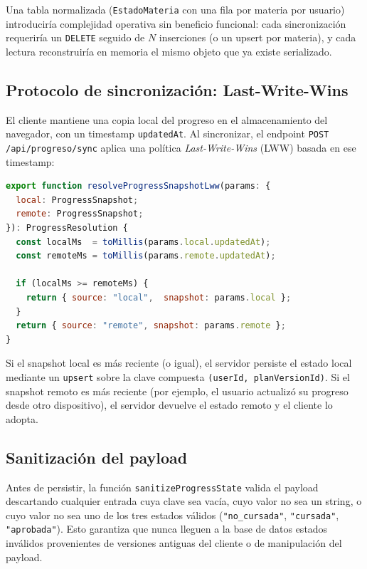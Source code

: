 \documentclass[12pt, a4paper]{report}
\begin{document}
Una tabla normalizada (\texttt{EstadoMateria} con una fila por materia por usuario)
introduciría complejidad operativa sin beneficio funcional: cada sincronización
requeriría un \texttt{DELETE} seguido de $N$ inserciones (o un upsert por materia),
y cada lectura reconstruiría en memoria el mismo objeto que ya existe serializado.

\subsection{Protocolo de sincronización: Last-Write-Wins}

El cliente mantiene una copia local del progreso en el almacenamiento del
navegador, con un timestamp \texttt{updatedAt}. Al sincronizar, el endpoint
\texttt{POST /api/progreso/sync} aplica una política
\textit{Last-Write-Wins} (LWW) basada en ese timestamp:

\begin{lstlisting}[language=JavaScript,
                   caption={Resolución LWW en \texttt{progressSync.ts}.}]
export function resolveProgressSnapshotLww(params: {
  local: ProgressSnapshot;
  remote: ProgressSnapshot;
}): ProgressResolution {
  const localMs  = toMillis(params.local.updatedAt);
  const remoteMs = toMillis(params.remote.updatedAt);

  if (localMs >= remoteMs) {
    return { source: "local",  snapshot: params.local };
  }
  return { source: "remote", snapshot: params.remote };
}
\end{lstlisting}

Si el snapshot local es más reciente (o igual), el servidor persiste el estado
local mediante un \texttt{upsert} sobre la clave compuesta
\texttt{(userId, planVersionId)}. Si el snapshot remoto es más reciente
(por ejemplo, el usuario actualizó su progreso desde otro dispositivo), el
servidor devuelve el estado remoto y el cliente lo adopta.

\subsection{Sanitización del payload}

Antes de persistir, la función \texttt{sanitizeProgressState} valida el payload
descartando cualquier entrada cuya clave sea vacía, cuyo valor no sea un string,
o cuyo valor no sea uno de los tres estados válidos (\texttt{"no\_cursada"},
\texttt{"cursada"}, \texttt{"aprobada"}). Esto garantiza que nunca lleguen a la
base de datos estados inválidos provenientes de versiones antiguas del cliente o
de manipulación del payload.
\end{document}
